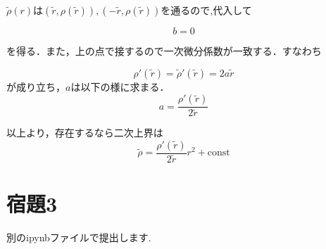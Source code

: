 \documentclass[a4paper,11pt]{jsarticle}
\begin{document}
  $\widetilde{\rho} (r) $は$(\widetilde{r}, \rho (\widetilde{r})), (-\widetilde{r}, \rho (\widetilde{r}))$を通るので,代入して

  \[ b=0 \]

  を得る．また，上の点で接するので一次微分係数が一致する．すなわち

  \[ \rho ' (\widetilde{r}) = \widetilde{\rho} ' (\widetilde{r}) = 2a\widetilde{r} \]
  が成り立ち，$a$は以下の様に求まる．
  \[ a = \frac{\rho ' (\widetilde{r})}{2\widetilde{r}} \]

  以上より，存在するなら二次上界は
  \[ \widetilde{\rho} = \frac{\rho ' (\widetilde{r})}{2 \widetilde{r}}r^2 + \text{const}\]
  \section*{宿題3}
  別のipynbファイルで提出します.
\end{document}

